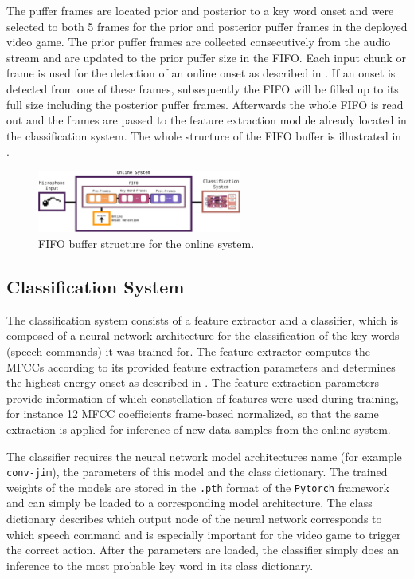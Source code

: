 The puffer frames are located prior and posterior to a key word onset and were selected to both 5 frames for the prior and posterior puffer frames in the deployed video game.
The prior puffer frames are collected consecutively from the audio stream and are updated to the prior puffer size in the FIFO. 
Each input chunk or frame is used for the detection of an online onset as described in .
If an onset is detected from one of these frames, subsequently the FIFO will be filled up to its full size including the posterior puffer frames.
Afterwards the whole FIFO is read out and the frames are passed to the feature extraction module already located in the classification system.
The whole structure of the FIFO buffer is illustrated in .
\begin{figure}[!ht]
  \centering
  \includegraphics[width=0.60\textwidth]{./6_game/figs/game_system_online}
  \caption{FIFO buffer structure for the online system.}
  \label{fig:game_system_online}
\end{figure}
\FloatBarrier
\noindent



\subsection{Classification System}
The classification system consists of a feature extractor and a classifier, which is composed of a neural network architecture for the classification of the key words (speech commands) it was trained for.
The feature extractor computes the MFCCs according to its provided feature extraction parameters and determines the highest energy onset as described in .
The feature extraction parameters provide information of which constellation of features were used during training, for instance 12 MFCC coefficients frame-based normalized, so that the same extraction is applied for inference of new data samples from the online system.

The classifier requires the neural network model architectures name (for example \texttt{conv-jim}), the parameters of this model and the class dictionary.
The trained weights of the  models are stored in the \texttt{.pth} format of the \texttt{Pytorch} framework and can simply be loaded to a corresponding model architecture.
The class dictionary describes which output node of the neural network corresponds to which speech command and is especially important for the video game to trigger the correct action.
After the parameters are loaded, the classifier simply does an inference to the most probable key word in its class dictionary.

